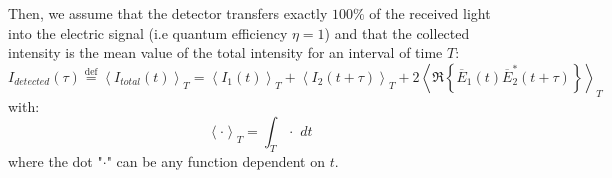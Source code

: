 \documentclass[11pt]{report}
\begin{document}
Then, we assume that the detector transfers exactly $100\% $ of the received light into the electric signal (i.e quantum efficiency $\eta = 1$) and that the collected intensity is the mean value of the total intensity for an interval of time $T$:
\begin{equation}
I_{detected}(\tau) \stackrel{\text{def}}{=} \left\langle I_{total}(t) \right\rangle_T = \left\langle I_1(t) \right\rangle_T + \left\langle I_2(t + \tau) \right\rangle _T + 2\left\langle \Re\left\lbrace \overline{E}_1(t) \overline{E}_2^*(t + \tau)\right\rbrace \right\rangle _T
\end{equation}
with:
\begin{equation}
\left\langle \cdot \right\rangle _T = \int_T \cdot \,\,dt
\end{equation}
where the dot "$\cdot$" can be any function dependent on $t$.
\end{document}
